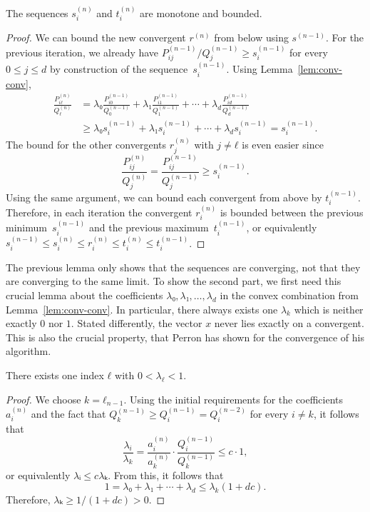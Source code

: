 \begin{lemma}
  The sequences $s_i^{(n)}$ and $t_i^{(n)}$ are monotone and bounded.
\end{lemma}

\begin{proof}
  We can bound the new convergent $r^{(n)}$ from below using $s^{(n-1)}$.
  For the previous iteration, we already have $P_{ij}^{(n-1)}/Q_j^{(n-1)} ≥ s_i^{(n-1)}$
  for every $0 ≤ j ≤ d$ by construction of the sequence~$s_i^{(n-1)}$.
  Using Lemma~\ref{lem:conv-conv},
  \begin{align*}
    \frac{P_{iℓ}^{(n)}}{Q_{ℓ}^{(n)}}
    & = λ₀ \frac{P_{i0}^{(n-1)}}{Q_0^{(n-1)}} + λ₁ \frac{P_{i1}^{(n-1)}}{Q_1^{(n-1)}} + ⋯ + λ_d \frac{P_{id}^{(n-1)}}{Q_d^{(n-1)}} \\
    & ≥ λ₀ s_i^{(n-1)} + λ₁ s_i^{(n-1)} + ⋯ + λ_d s_i^{(n-1)} = s_i^{(n-1)}.
  \end{align*}
  The bound for the other convergents $r_j^{(n)}$ with $j ≠ ℓ$ is even easier since
  \[
    \frac{P_{ij}^{(n)}}{Q_j^{(n)}} = \frac{P_{ij}^{(n-1)}}{Q_j^{(n-1)}} ≥ s_i^{(n-1)}.
  \]
  Using the same argument, we can bound each convergent from above by $t_i^{(n-1)}$.
  Therefore, in each iteration the convergent $r_i^{(n)}$ is
  bounded between the previous minimum~$s_i^{(n-1)}$ and the previous maximum~$t_i^{(n-1)}$,
  or equivalently $s_i^{(n-1)} ≤ s_i^{(n)} ≤ r_i^{(n)} ≤ t_i^{(n)} ≤ t_i^{(n-1)}$.
\end{proof}

The previous lemma only shows that the sequences are converging,
not that they are converging to the same limit.
To show the second part, we first need this crucial lemma
about the coefficients $λ₀, λ₁, …, λ_d$ in the convex combination from Lemma~\ref{lem:conv-conv}.
In particular, there always exists one $λ_k$ which is neither exactly $0$ nor $1$.
Stated differently, the vector $x$ never lies exactly on a convergent. %
This is also the crucial property, that Perron has shown for the convergence of
his algorithm.

\begin{lemma}
  \label{lem:lambda-pos}
  There exists one index $ℓ$ with $0 < λ_ℓ < 1$.
\end{lemma}

\begin{proof}
  We choose $k = ℓ_{n-1}$.
  Using the initial requirements for the coefficients $a_i^{(n)}$ and the fact
  that $Q_k^{(n-1)} ≥ Q_i^{(n-1)} = Q_i^{(n-2)}$ for every $i ≠ k$,
  it follows that
  \[
    \frac{λ_i}{λ_k} = \frac{a_i^{(n)}}{a_k^{(n)}} · \frac{Q_i^{(n-1)}}{Q_k^{(n-1)}} ≤ c · 1,
  \]
  or equivalently $λᵢ ≤ c λₖ$. From this, it follows that
  \[
    1 = λ₀ + λ₁ + ⋯ + λ_d ≤ λ_k (1 + dc).
  \]
  Therefore, $λₖ ≥ 1/(1 + dc) > 0$.
\end{proof}

